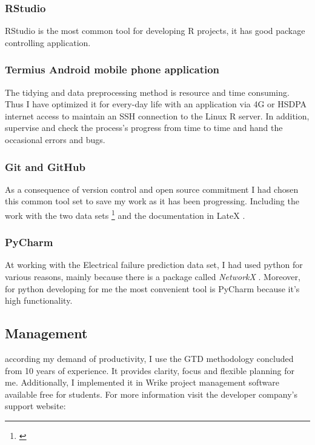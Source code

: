 			\subsubsection{RStudio}
RStudio is the most common tool for developing R projects, it has good package controlling application.
\cite{RStudio}
			\subsubsection{Termius Android mobile phone application}
The tidying and data preprocessing method is resource and time consuming. Thus I have optimized it for every-day life with an application via 4G or HSDPA internet access to maintain an SSH connection to the Linux R server. In addition, supervise and check the process's progress from time to time and hand the occasional errors and bugs.
\cite{Termius}
			\subsubsection{Git and GitHub}
As a consequence of version control and open source commitment I had chosen this common tool set \cite{Github} to save my work as it has been progressing. Including the work with the two data sets \footnote{\cite{GitHub_CAN_RUL,GitHub_FP_RUL}} and the documentation in LateX \cite{GitHub_Thesis_Text}.
			\subsubsection{PyCharm}
At working with the Electrical failure prediction data set, I had used python for various reasons, mainly because there is a package called \textit{NetworkX} \cite{NetworkX}. Moreover, for python developing for me the most convenient tool is PyCharm because it's high functionality.
\cite{PyCharm}	
		\subsection{Management}
according my demand of productivity, I use the GTD\cite{GTD} methodology concluded from 10 years of experience. It provides clarity, focus and flexible planning for me. Additionally, I implemented it in Wrike \cite{WRIKE} project management software available free for students. For more information visit the developer company's support website: \cite{WRIKE_for_students}